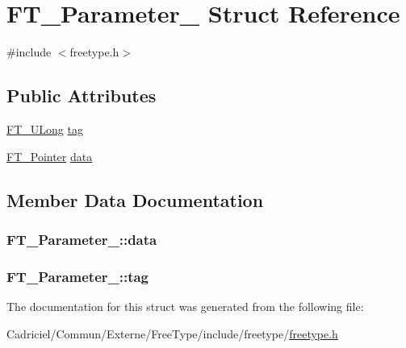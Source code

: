 \hypertarget{struct_f_t___parameter__}{\section{F\-T\-\_\-\-Parameter\-\_\- Struct Reference}
\label{struct_f_t___parameter__}
}


{\ttfamily \#include $<$freetype.\-h$>$}

\subsection*{Public Attributes}
\begin{DoxyCompactItemize}
\item 
\hyperlink{fttypes_8h_a4fac88bdba78eb76b505efa6e4fbf3f5}{F\-T\-\_\-\-U\-Long} \hyperlink{struct_f_t___parameter___a5a53ef2652683a2cd9ee6a0a694cb76b}{tag}
\item 
\hyperlink{fttypes_8h_a00f9e6a0ddd7bc55f79b2f4b5b867266}{F\-T\-\_\-\-Pointer} \hyperlink{struct_f_t___parameter___a930c8885bd25be8d054443153c817c13}{data}
\end{DoxyCompactItemize}


\subsection{Member Data Documentation}
\hypertarget{struct_f_t___parameter___a930c8885bd25be8d054443153c817c13}{
\subsubsection[{data}]{ F\-T\-\_\-\-Parameter\-\_\-\-::data}}\label{struct_f_t___parameter___a930c8885bd25be8d054443153c817c13}
\hypertarget{struct_f_t___parameter___a5a53ef2652683a2cd9ee6a0a694cb76b}{
\subsubsection[{tag}]{ F\-T\-\_\-\-Parameter\-\_\-\-::tag}}\label{struct_f_t___parameter___a5a53ef2652683a2cd9ee6a0a694cb76b}


The documentation for this struct was generated from the following file\-:\begin{DoxyCompactItemize}
\item 
Cadriciel/\-Commun/\-Externe/\-Free\-Type/include/freetype/\hyperlink{freetype_8h}{freetype.\-h}\end{DoxyCompactItemize}
